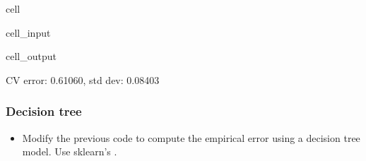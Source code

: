 \documentclass[letterpaper,10pt,english]{jupyterBook}
\begin{document}
\begin{sphinxuseclass}{cell}
\begin{sphinxVerbatimInput}
\begin{sphinxuseclass}{cell_input}
\end{sphinxuseclass}\end{sphinxVerbatimInput}
\begin{sphinxVerbatimOutput}

\begin{sphinxuseclass}{cell_output}
\begin{sphinxVerbatim}[commandchars=\\\{\}]
CV error: 0.61060, std dev: 0.08403
\end{sphinxVerbatim}

\end{sphinxuseclass}\end{sphinxVerbatimOutput}

\end{sphinxuseclass}

\subsubsection{Decision tree}
\label{\detokenize{05:decision-tree}}\begin{itemize}
\item {} 
\sphinxAtStartPar
Modify the previous code to compute the empirical error using a decision tree model. Use sklearn’s .

\end{itemize}
\end{document}
